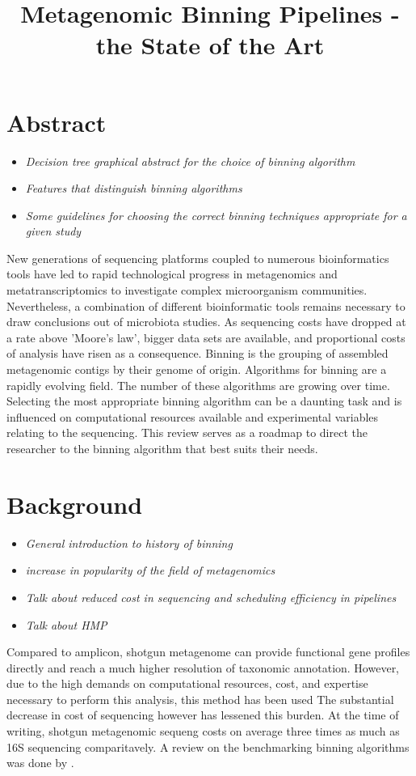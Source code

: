 \documentclass{article}
\title{Metagenomic Binning Pipelines - the State of the Art}
\date{}
\begin{document}
\maketitle

\section{Abstract}
\begin{itemize}
	\item \emph{Decision tree graphical abstract for the choice of binning algorithm}
	\item \emph{Features that distinguish binning algorithms}
	\item \emph{Some guidelines for choosing the correct binning techniques appropriate for a given study}
\end{itemize}
New generations of sequencing platforms coupled to numerous bioinformatics tools have led to rapid technological progress in metagenomics and metatranscriptomics to investigate complex microorganism communities.
Nevertheless, a combination of different bioinformatic tools remains necessary to draw conclusions out of microbiota studies.
As sequencing costs have dropped at a rate above 'Moore's law', bigger data sets are available, and proportional costs of analysis have risen as a consequence.
Binning is the grouping of assembled metagenomic contigs by their genome of origin.
Algorithms for binning are a rapidly evolving field.
The number of these algorithms are growing over time.
Selecting the most appropriate binning algorithm can be a daunting task and is influenced on computational resources available and experimental variables relating to the sequencing.
This review serves as a roadmap to direct the researcher to the binning algorithm that best suits their needs.

\section{Background}
\begin{itemize}
	\item \emph{General introduction to history of binning}
	\item \emph{increase in popularity of the field of metagenomics}
	\item \emph{Talk about reduced cost in sequencing and scheduling efficiency in pipelines}
	\item \emph{Talk about HMP}
\end{itemize}
Compared to amplicon, shotgun metagenome can provide functional gene profiles directly and reach a much higher resolution of taxonomic annotation.
However, due to the high demands on computational resources, cost, and expertise necessary to perform this analysis, this method has been used
The substantial decrease in cost of sequencing however has lessened this burden. 
At the time of writing, shotgun metagenomic sequeng costs on average three times as much as 16S sequencing comparitavely.
A review on the benchmarking binning algorithms was done by .
	
\end{document}
